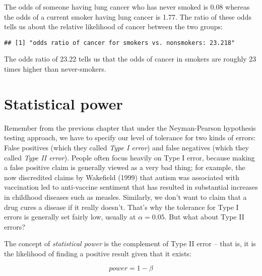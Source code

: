 \documentclass[]{book}
\newenvironment{Shaded}{\begin{snugshade}}{\end{snugshade}}
\newcommand{\KeywordTok}[1]{\textcolor[rgb]{0.13,0.29,0.53}{\textbf{#1}}}
\newcommand{\StringTok}[1]{\textcolor[rgb]{0.31,0.60,0.02}{#1}}
\newcommand{\CommentTok}[1]{\textcolor[rgb]{0.56,0.35,0.01}{\textit{#1}}}
\newcommand{\OperatorTok}[1]{\textcolor[rgb]{0.81,0.36,0.00}{\textbf{#1}}}
\newcommand{\NormalTok}[1]{#1}
\theoremstyle{definition}
\theoremstyle{definition}
\theoremstyle{definition}
\theoremstyle{remark}
\begin{document}
The odds of someone having lung cancer who has never smoked is 0.08
whereas the odds of a current smoker having lung cancer is 1.77. The
ratio of these odds tells us about the relative likelihood of cancer
between the two groups:

\begin{Shaded}
\end{Shaded}

\begin{verbatim}
## [1] "odds ratio of cancer for smokers vs. nonsmokers: 23.218"
\end{verbatim}

The odds ratio of 23.22 tells us that the odds of cancer in smokers are
roughly 23 times higher than never-smokers.

\section{Statistical power}\label{statistical-power}

Remember from the previous chapter that under the Neyman-Pearson
hypothesis testing approach, we have to specify our level of tolerance
for two kinds of errors: False positives (which they called \emph{Type I
error}) and false negatives (which they called \emph{Type II error}).
People often focus heavily on Type I error, because making a false
positive claim is generally viewed as a very bad thing; for example, the
now discredited claims by Wakefield (1999) that autism was associated
with vaccination led to anti-vaccine sentiment that has resulted in
substantial increases in childhood diseases such as measles. Similarly,
we don't want to claim that a drug cures a disease if it really doesn't.
That's why the tolerance for Type I errors is generally set fairly low,
usually at \(\alpha = 0.05\). But what about Type II errors?

The concept of \emph{statistical power} is the complement of Type II
error -- that is, it is the likelihood of finding a positive result
given that it exists:

\[ 
power = 1 - \beta
\]
\end{document}
